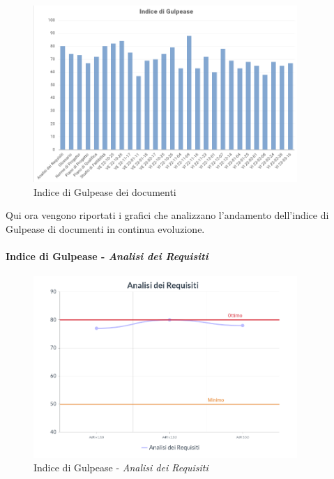 \begin{center}
\begin{figure}[H]
  \centering
  \renewcommand{\thefigure}{7}
  \includegraphics[width=10cm]{./res/images/GulpeaseGen.png}
  \caption{Indice di Gulpease dei documenti}
  \label{fig:Indice di Gulpease dei documenti}
\end{figure}
\end{center}
\pagebreak
\noindent Qui ora vengono riportati i grafici che analizzano l'andamento dell'indice di Gulpease di documenti in continua evoluzione.
\paragraph{Indice di Gulpease - \textit{Analisi dei Requisiti}}
\begin{center}
\begin{figure}[H]
  \centering
  \renewcommand{\thefigure}{8}
  \includegraphics[width=10cm]{./res/images/AdRGraph.png}
  \caption{Indice di Gulpease - \textit{Analisi dei Requisiti}}
  \label{fig:Indice di Gulpease - Analisi dei Requisiti}
\end{figure}
\end{center}
\pagebreak
